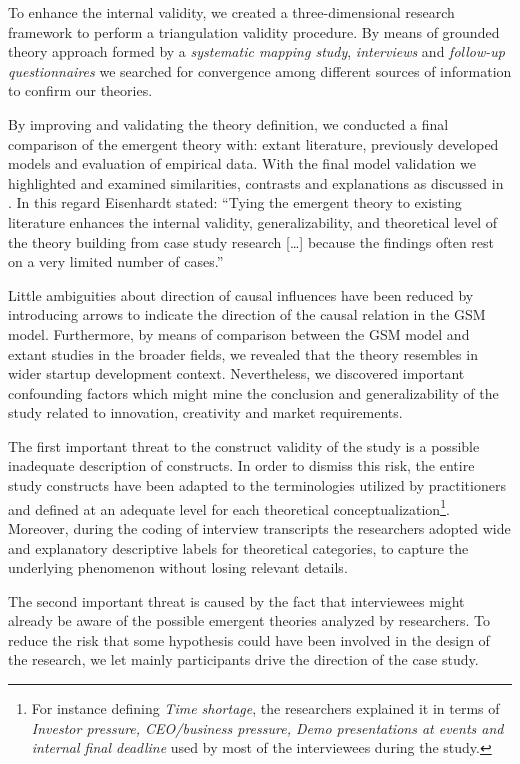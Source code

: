 \documentclass[10pt,journal,letterpaper,compsoc]{IEEEtran}
\begin{document}
To enhance the internal validity, we created a three-dimensional research framework to perform a triangulation validity procedure. By means of grounded theory approach formed by a \textit{systematic mapping study}, \textit{interviews} and  \textit{follow-up questionnaires} we searched for convergence among different sources of information to confirm our theories.

By improving and validating the theory definition, we conducted a final comparison of the emergent theory with: extant literature, previously developed models and evaluation of empirical data. With the final model validation we highlighted and examined similarities, contrasts and explanations as discussed in \cite{Eisenhardt2007}.  In this regard Eisenhardt stated: ``Tying the emergent theory to existing literature enhances the internal validity, generalizability, and theoretical level of the theory building from case study research [\ldots] because the findings often rest on a very limited number of cases.''

Little ambiguities about direction of causal influences have been reduced by introducing arrows to indicate the direction of the causal relation in the GSM model. Furthermore, by means of comparison between the GSM model and extant studies in the broader fields, we revealed that the theory resembles in wider startup development context. Nevertheless, we discovered important confounding factors which might mine the conclusion and generalizability of the study related to innovation, creativity and market requirements.

The first important threat to the construct validity of the study is a possible inadequate description of constructs. In order to dismiss this risk, the entire study constructs have been adapted to the terminologies utilized by practitioners and defined at an adequate level for each theoretical conceptualization\footnote{For instance defining \textit{Time shortage}, the researchers explained it in terms of \textit{Investor pressure, CEO/business pressure, Demo presentations at events and internal final deadline} used by most of the interviewees during the study.}. Moreover, during the coding of interview transcripts the researchers adopted wide and explanatory descriptive labels for theoretical categories, to capture the underlying phenomenon without losing relevant details.

The second important threat is caused by the fact that interviewees might already be aware of the possible emergent theories analyzed by researchers. To reduce the risk that some hypothesis could have been involved in the design of the research, we let mainly participants drive the direction of the case study.
\end{document}

